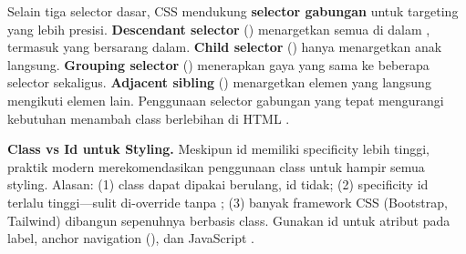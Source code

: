 Selain tiga selector dasar, CSS mendukung \textbf{selector gabungan} untuk targeting yang lebih presisi. \textbf{Descendant selector} () menargetkan semua  di dalam , termasuk yang bersarang dalam. \textbf{Child selector} () hanya menargetkan anak langsung. \textbf{Grouping selector} () menerapkan gaya yang sama ke beberapa selector sekaligus. \textbf{Adjacent sibling} () menargetkan elemen yang langsung mengikuti elemen lain. Penggunaan selector gabungan yang tepat mengurangi kebutuhan menambah class berlebihan di HTML \cite{mdnCss}.


\begin{catatan}
\textbf{Class vs Id untuk Styling.} Meskipun id memiliki specificity lebih tinggi, praktik modern merekomendasikan penggunaan class untuk hampir semua styling. Alasan: (1) class dapat dipakai berulang, id tidak; (2) specificity id terlalu tinggi---sulit di-override tanpa ; (3) banyak framework CSS (Bootstrap, Tailwind) dibangun sepenuhnya berbasis class. Gunakan id untuk atribut  pada label, anchor navigation (), dan JavaScript \cite{cssTricks}.
\end{catatan}

